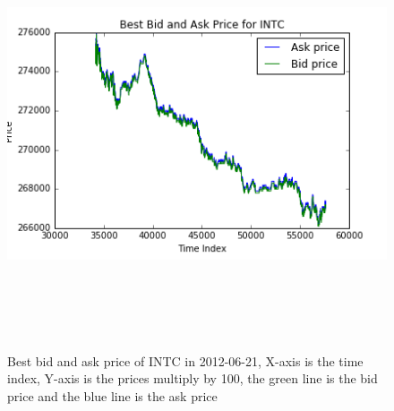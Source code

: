 \begin{figure} [hp]
  \begin{center}
    \includegraphics[width=6in,  height=5in]{figures/INTC_price.png}
  \end{center}
\caption{Best bid and ask price of INTC in 2012-06-21,    X-axis is the time index,   Y-axis is the prices multiply by 100,   the green line is the bid price and the blue line is the ask price} \label{fig:intc_price}
\end{figure}

